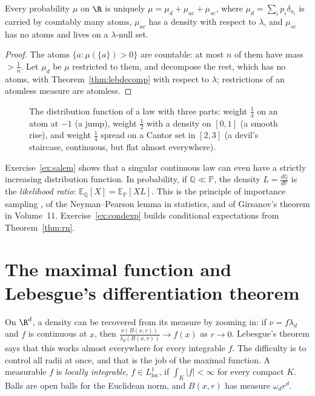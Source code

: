 \begin{corollary}\label{cor:threeparts}
Every probability $\mu$ on $\R$ is uniquely $\mu=\mu_d+\mu_{ac}+\mu_{sc}$, where $\mu_d=\sum_ip_i\delta_{a_i}$ is carried by countably many atoms, $\mu_{ac}$ has a density with respect to $\lambda$, and $\mu_{sc}$ has no atoms and
lives on a $\lambda$-null set.
\end{corollary}
\begin{proof}
The atoms $\{a:\mu(\{a\})>0\}$ are countable: at most $n$ of them have mass $>\frac1n$. Let $\mu_d$ be $\mu$ restricted to them, and decompose the rest, which has no atoms, with Theorem~\ref{thm:lebdecomp}
with respect to $\lambda$; restrictions of an atomless measure are atomless.
\end{proof}

\begin{figure}[ht]
\centering
{}
\caption{The distribution function of a law with three parts: weight $\frac14$ on an atom at $-1$ (a jump), weight $\frac12$ with a density on $[0,1]$ (a smooth rise), and weight $\frac14$ spread on a Cantor set
in $[2,3]$ (a devil's staircase, continuous, but flat almost everywhere).}
\label{fig:threeparts}
\end{figure}

Exercise~\ref{ex:salem} shows that a singular continuous law can even have a strictly increasing distribution function. In probability, if $\mathbb Q\ll\mathbb P$, the density $L=\frac{d\mathbb Q}{d\mathbb P}$ is
the \emph{likelihood ratio}: $\mathbb E_{\mathbb Q}[X]=\mathbb E_{\mathbb P}[XL]$. This is the principle of importance sampling , of the Neyman--Pearson lemma in statistics, and of
Girsanov's theorem in Volume~11. Exercise~\ref{ex:condexp} builds conditional expectations from Theorem~\ref{thm:rn}.

\section{The maximal function and Lebesgue's differentiation theorem}

On $\R^d$, a density can be recovered from its measure by zooming in: if $\nu=f\lambda_d$ and $f$ is continuous at $x$, then $\frac{\nu(B(x,r))}{\lambda_d(B(x,r))}\to f(x)$ as $r\to0$. Lebesgue's theorem says that this
works almost everywhere for every integrable $f$. The difficulty is to control all radii at once, and that is the job of the maximal function. A measurable $f$ is \emph{locally integrable}, $f\in L^1_{\mathrm{loc}}$, if
$\int_K|f|<\infty$ for every compact $K$. Balls are open balls for the Euclidean norm, and $B(x,r)$ has measure $\omega_dr^d$.

